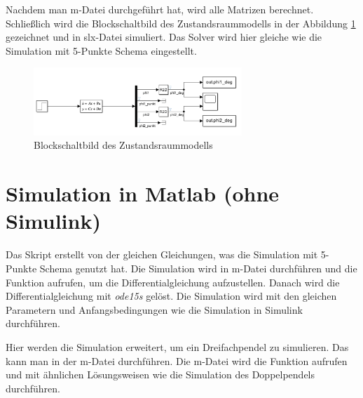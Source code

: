 Nachdem man m-Datei  durchgeführt hat, wird alle Matrizen berechnet. Schließlich wird die Blockschaltbild des Zustandsraummodells in der Abbildung \ref{fig:Blockschaltbild_Zustandsraum} gezeichnet und in slx-Datei  simuliert. Das Solver wird hier gleiche wie die Simulation mit 5-Punkte Schema eingestellt.
\begin{figure}[H]
  \centering
  \includegraphics[width=0.7\textwidth]{figures/Blockschaltbild_Zustandsraum.png}
  \caption{Blockschaltbild des Zustandsraummodells}
  \label{fig:Blockschaltbild_Zustandsraum}
\end{figure}

\section{Simulation in Matlab (ohne Simulink)}
Das Skript erstellt von der gleichen Gleichungen, was die Simulation mit 5-Punkte Schema genutzt hat. Die Simulation wird in m-Datei  durchführen und die Funktion  aufrufen, um die Differentialgleichung aufzustellen. Danach wird die Differentialgleichung mit \textit{ode15s} gelöst. Die Simulation wird mit den gleichen Parametern und Anfangsbedingungen wie die Simulation in Simulink durchführen. 

Hier werden die Simulation erweitert, um ein Dreifachpendel zu simulieren. Das kann man in der m-Datei  durchführen. Die m-Datei  wird die Funktion  aufrufen und mit ähnlichen Lösungsweisen wie die Simulation des Doppelpendels durchführen. 

